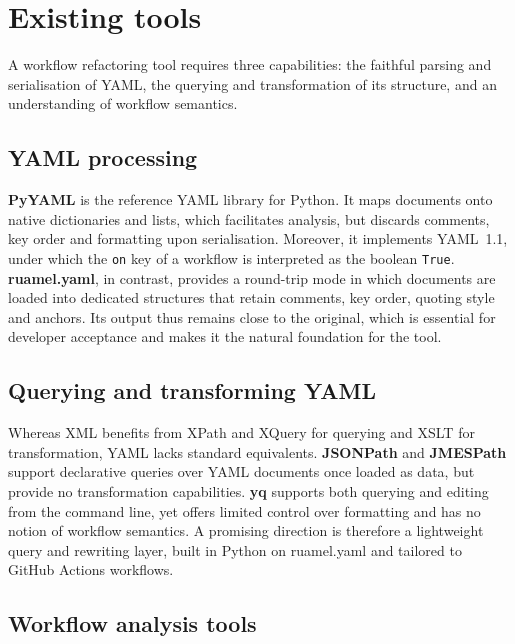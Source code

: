 \documentclass[a4paper,11pt,notitlepage]{report}
\begin{document}
\chapter{Existing tools} \label{ch_tools}

A workflow refactoring tool requires three capabilities: the faithful parsing and
serialisation of YAML, the querying and transformation of its structure, and an
understanding of workflow semantics.

\section{YAML processing} \label{sec_yaml}

\textbf{PyYAML} is the reference YAML library for Python. It maps documents onto native
dictionaries and lists, which facilitates analysis, but discards comments, key order and
formatting upon serialisation. Moreover, it implements YAML~1.1, under which the
\texttt{on} key of a workflow is interpreted as the boolean \texttt{True}.
\textbf{ruamel.yaml}, in contrast, provides a round-trip mode in which documents are
loaded into dedicated structures that retain comments, key order, quoting style and
anchors. Its output thus remains close to the original, which is essential for developer
acceptance and makes it the natural foundation for the tool.

\section{Querying and transforming YAML} \label{sec_query}

Whereas XML benefits from XPath and XQuery for querying and XSLT for transformation, YAML
lacks standard equivalents. \textbf{JSONPath} and \textbf{JMESPath} support declarative
queries over YAML documents once loaded as data, but provide no transformation
capabilities. \textbf{yq} supports both querying and editing from the command line, yet
offers limited control over formatting and has no notion of workflow semantics.
A promising direction is therefore a lightweight query and rewriting layer, built in
Python on ruamel.yaml and tailored to GitHub Actions workflows.

\section{Workflow analysis tools} \label{sec_analysis}
\end{document}
